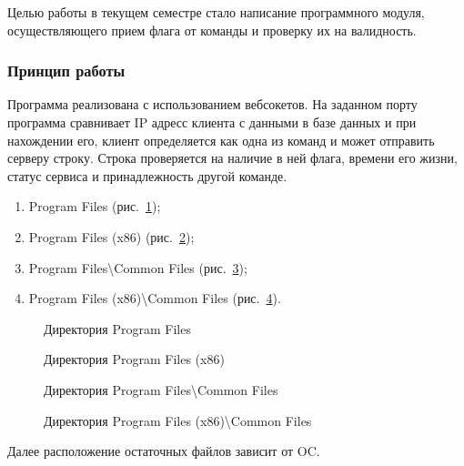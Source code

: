 Целью работы в текущем семестре стало написание программного модуля, осуществляющего прием флага от команды и проверку их на валидность.

\subsubsection{Принцип работы}

Программа реализована с использованием вебсокетов. На заданном порту программа сравнивает IP адресс клиента с данными в базе данных и при нахождении его, клиент определяется как одна из команд и может отправить серверу строку. Строка проверяется на наличие в ней флага, времени его жизни, статус сервиса и принадлежность другой команде.

\begin{enumerate}
  \item Program Files (рис.~\ref{kucher_1:kucher_1});
  \item Program Files (x86) (рис.~\ref{kucher_2:kucher_2});
  \item Program Files\textbackslash Common Files (рис.~\ref{kucher_3:kucher_3});
  \item Program Files (x86)\textbackslash Common Files (рис.~\ref{kucher_4:kucher_4}).
\end{enumerate}

\begin{figure}[h!]
\caption{Директория Program Files}
\label{kucher_1:kucher_1}
\end{figure} 

\begin{figure}[h!]
\caption{Директория Program Files (x86)}
\label{kucher_2:kucher_2}
\end{figure} 

\begin{figure}[h!]
\caption{Директория Program Files\textbackslash Common Files}
\label{kucher_3:kucher_3}
\end{figure} 

\begin{figure}[h!]
\caption{Директория Program Files (x86)\textbackslash Common Files}
\label{kucher_4:kucher_4}
\end{figure} 


Далее расположение остаточных файлов зависит от OC.

